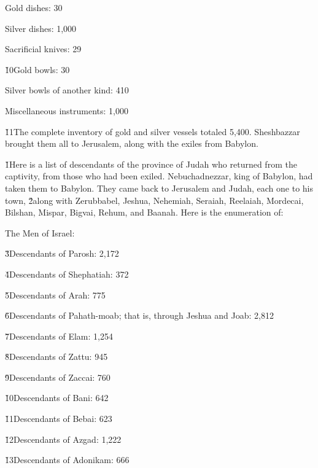 Gold dishes: 30

Silver dishes: 1,000

Sacrificial knives: 29

\v{10}Gold bowls: 30

Silver bowls of another kind: 410

Miscellaneous instruments: 1,000

\v{11}The complete inventory of gold and silver vessels totaled 5,400. Sheshbazzar brought them all to Jerusalem, along with the exiles from Babylon.

\v{1}Here is a list of descendants of the province of Judah who returned from the captivity, from those who had been exiled. Nebuchadnezzar, king of Babylon, had taken them to Babylon. They came back to Jerusalem and Judah, each one to his town, \v{2}along with Zerubbabel, Jeshua, Nehemiah, Seraiah, Reelaiah, Mordecai, Bilshan, Mispar, Bigvai, Rehum, and Baanah. Here is the enumeration of:

The Men of Israel:

\v{3}Descendants of Parosh: 2,172

\v{4}Descendants of Shephatiah: 372

\v{5}Descendants of Arah: 775

\v{6}Descendants of Pahath-moab; that is, through Jeshua and Joab: 2,812

\v{7}Descendants of Elam: 1,254

\v{8}Descendants of Zattu: 945

\v{9}Descendants of Zaccai: 760

\v{10}Descendants of Bani: 642

\v{11}Descendants of Bebai: 623

\v{12}Descendants of Azgad: 1,222

\v{13}Descendants of Adonikam: 666

